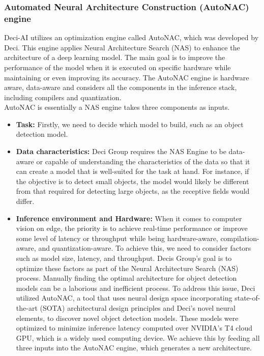 \subsubsection{Automated Neural Architecture Construction (AutoNAC) engine}
Deci-AI utilizes an optimization engine called AutoNAC, which was developed by Deci. This engine applies Neural Architecture Search (NAS) to enhance the architecture of a deep learning model. The main goal is to improve the performance of the model when it is executed on specific hardware while maintaining or even improving its accuracy. The AutoNAC engine is hardware aware, data-aware and considers all the components in the inference stack, including compilers and quantization. \\
AutoNAC is essentially a NAS engine takes three components as inputs. \cite{yolo-nas-webinar}
\begin{itemize}
    \item \textbf{Task: } Firstly, we need to decide which model to build, such as an object detection model.\\
    \item \textbf{Data characteristics: } Deci Group requires the NAS Engine to be data-aware or capable of understanding the characteristics of the data so that it can create a model that is well-suited for the task at hand. For instance, if the objective is to detect small objects, the model would likely be different from that required for detecting large objects, as the receptive fields would differ. \\
    \item \textbf{Inference environment and Hardware: } When it comes to computer vision on edge, the priority is to achieve real-time performance or improve some level of latency or throughput while being hardware-aware, compilation-aware, and quantization-aware. To achieve this, we need to consider factors such as model size, latency, and throughput. Decis Group's goal is to optimize these factors as part of the Neural Architecture Search (NAS) process. Manually finding the optimal architecture for object detection models can be a laborious and inefficient process. To address this issue, Deci utilized AutoNAC, a tool that uses neural design space incorporating state-of-the-art (SOTA) architectural design principles and Deci's novel neural elements, to discover novel object detection models. These models were optimized to minimize inference latency computed over NVIDIA's T4 cloud GPU, which is a widely used computing device. We achieve this by feeding all three inputs into the AutoNAC engine, which generates a new architecture.
\end{itemize}
 

